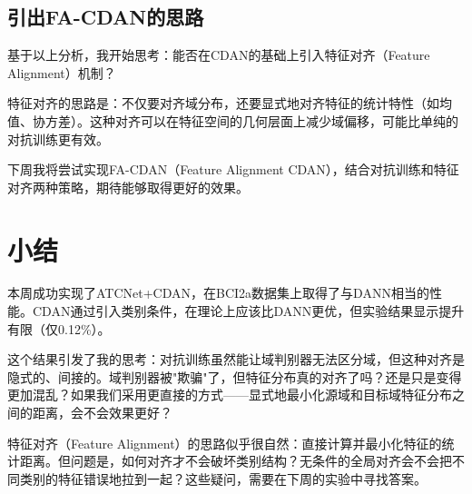 \documentclass[12pt,a4paper]{ctexart}
\begin{document}
\subsection{引出FA-CDAN的思路}

基于以上分析，我开始思考：能否在CDAN的基础上引入特征对齐（Feature Alignment）机制？

特征对齐的思路是：不仅要对齐域分布，还要显式地对齐特征的统计特性（如均值、协方差）。这种对齐可以在特征空间的几何层面上减少域偏移，可能比单纯的对抗训练更有效。

下周我将尝试实现FA-CDAN（Feature Alignment CDAN），结合对抗训练和特征对齐两种策略，期待能够取得更好的效果。

\section{小结}

本周成功实现了ATCNet+CDAN，在BCI2a数据集上取得了与DANN相当的性能。CDAN通过引入类别条件，在理论上应该比DANN更优，但实验结果显示提升有限（仅0.12\%）。

这个结果引发了我的思考：对抗训练虽然能让域判别器无法区分域，但这种对齐是隐式的、间接的。域判别器被"欺骗"了，但特征分布真的对齐了吗？还是只是变得更加混乱？如果我们采用更直接的方式——显式地最小化源域和目标域特征分布之间的距离，会不会效果更好？

特征对齐（Feature Alignment）的思路似乎很自然：直接计算并最小化特征的统计距离。但问题是，如何对齐才不会破坏类别结构？无条件的全局对齐会不会把不同类别的特征错误地拉到一起？这些疑问，需要在下周的实验中寻找答案。
\end{document}
